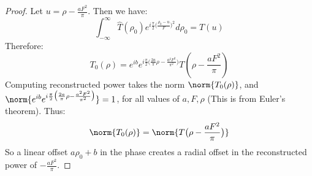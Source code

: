 \documentclass[crop=false,class=book,oneside]{standalone}
\begin{document}
\begin{proof}
            Let $u = \rho - \frac{aF^2}{\pi}$. Then we have:
            \begin{equation*}
            \int_{-\infty}^{\infty} \hat{T}(\rho_0)e^{i\frac{\pi}{2}\big(\frac{\rho_0 - u}{F}\big)^2}d\rho_0 = T(u)
            \end{equation*}
            Therefore:
            \begin{equation*}
            T_0(\rho) = e^{ib}e^{i\frac{\pi}{2}\big(\frac{2a}{\pi}\rho - \frac{a^2F^2}{\pi^2}\big)}T(\rho - \frac{aF^2}{\pi})
            \end{equation*}
            Computing reconstructed power takes the norm $\norm{T_{0}(\rho)}$, and $\norm{e^{ib}e^{i\frac{\pi}{2}\big(\frac{2a}{\pi}\rho - \frac{a^2F^2}{\pi^2}\big)}} = 1$, for all values of $a,F, \rho$ (This is from Euler's theorem). Thus:
            \begin{equation*}
                \norm{T_{0}(\rho)} = \norm{T\big(\rho - \frac{aF^2}{\pi}\big)}    
            \end{equation*}
            So a linear offset $a\rho_0+b$ in the phase creates a radial offset in the reconstructed power of $-\frac{aF^2}{\pi}$.
            \end{proof}
\end{document}
